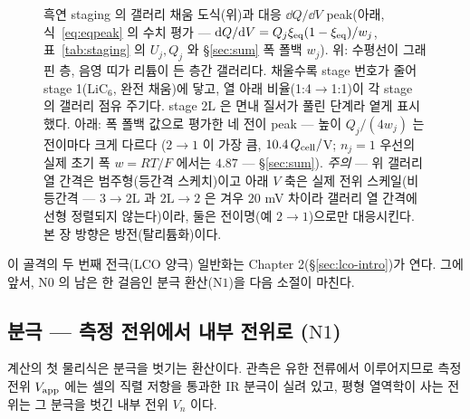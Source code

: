 \begin{figure}[t]
\caption{흑연 staging 의 갤러리 채움 도식(위)과 대응 $\dd Q/\dd V$ peak(아래, 식~\eqref{eq:eqpeak} 의
수치 평가 --- $\mathrm{d} Q/\mathrm{d} V=Q_j\xi_{\mathrm{eq}}(1-\xi_{\mathrm{eq}})/w_j$, 표~\ref{tab:staging} 의 $U_j,Q_j$ 와 \S\ref{sec:sum} 폭 폴백 $w_j$).
위: 수평선이 그래핀 층, 음영 띠가 리튬이 든 층간 갤러리다. 채울수록 stage 번호가 줄어 stage 1($\mathrm{LiC_6}$,
완전 채움)에 닿고, 열 아래 비율(1:4$\to$1:1)이 각 stage 의 갤러리 점유 주기다. stage $2\mathrm L$ 은 면내 질서가
풀린 단계라 옅게 표시했다. 아래: 폭 폴백 값으로 평가한 네 전이 peak --- 높이 $Q_j/(4w_j)$ 는 전이마다 크게 다르다
($2\to1$ 이 가장 큼, $10.4\,Q_{\mathrm{cell}}/$V; $n_j{=}1$ 우선의 실제 초기 폭 $w{=}RT/F$ 에서는 $4.87$ --- \S\ref{sec:sum}). \emph{주의} --- 위 갤러리 열 간격은 범주형(등간격 스케치)이고 아래 $V$
축은 실제 전위 스케일(비등간격 --- $3\to2\mathrm L$ 과 $2\mathrm L\to2$ 은 겨우 $20$ mV 차이라 갤러리 열 간격에
선형 정렬되지 않는다)이라, 둘은 전이명(예 $2\to1$)으로만 대응시킨다. 본 장 방향은 방전(탈리튬화)이다.}
\label{fig:staging}
\end{figure}

이 골격의 두 번째 전극(LCO 양극) 일반화는 Chapter 2(\S\ref{sec:lco-intro})가 연다. 그에 앞서, $\mathrm N0$ 의
남은 한 걸음인 분극 환산($\mathrm N1$)을 다음 소절이 마친다.

\subsection{분극 --- 측정 전위에서 내부 전위로 ($\mathrm N1$)}\label{sec:pol}
계산의 첫 물리식은 분극을 벗기는 환산이다. 관측은 유한 전류에서 이루어지므로 측정 전위 $V_{\mathrm{app}}$ 에는 셀의
직렬 저항을 통과한 IR 분극이 실려 있고, 평형 열역학이 사는 전위는 그 분극을 벗긴 내부 전위 $V_n$ 이다.

